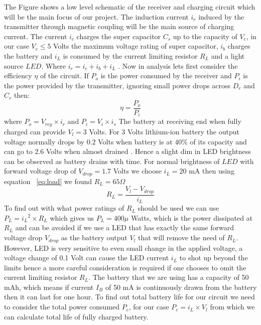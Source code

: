 
The Figure %
shows a low level schematic of the receiver and charging circuit which will be the main focus of our project. The induction current $i_r$ induced by the transmitter through magnetic coupling will be the main source of charging current. The current $i_c$ charges the super capacitor $C_s$ up to the capacity of $V_c$, in our case $V_c \leq 5$ Volts the maximum voltage rating of super capacitor, $i_b$ charges the battery and $i_L$ is consumed by the current limiting resistor $R_L$  and a light source $LED$. Where $i_r = i_c + i_b +i_L$ . Now in analysis lets first consider the efficiency ${\eta}$ of the circuit.
If $P_{o}$ is the power consumed by the receiver and $P_{i}$ is the power provided by the transmitter, ignoring small power drops across $D_r$ and $C_r$  then:
\begin{equation}\label{eq:effb}
 {\eta} = \frac{P_o}{P_i}
\end{equation}
where $P_o = V_{reg} \times i_r $ and $P_i = V_i \times i_s $
The battery at receiving end when fully charged can provide $V_l = 3 $ Volts.
For 3 Volts lithium-ion battery the output voltage normally drops by $0.2 $ Volts when battery is at $40 \%$ of its capacity and can go to $2.6 $ Volts when almost drained \cite{IAmp}. Hence a slight dim in LED brightness can be observed as battery drains with time.
For normal brightness of $LED$ with forward voltage drop of $V_{drop} = 1.7 $ Volts we choose $i_L = 20 $ mA then using equation ~\ref{eq:load} we found $R_L = 65 \Omega $
\begin{equation}\label{eq:load}
 R_L = \frac{V_l - V_{drop}}{i_L}
\end{equation}
To find out with what power ratings of $R_L$ should be used we can use $P_L = {i_L}^2 \times R_L $ which gives us $P_L = 400 \mu$ Watts, which is the power dissipated at $R_L$ and can be avoided if we use a LED that has exactly the same forward voltage drop $V_{drop}$ as the battery output $V_l$ that will remove the need of $R_L$. However, LED is very sensitive to even small change in the applied voltage, a voltage change of 0.1 Volt can cause the LED current $i_L$ to shot up beyond the limits hence a more careful consideration is required if one chooses to omit the current limiting resistor $R_L$.
The battery that we are using has a capacity of 50 mAh, which means if current $I_B$ of 50 mA  is continuously drawn from the battery then it can last for one hour. To find out total battery life for our circuit we need to consider the total power consumed $P_c$, for our case $P_c = i_L \times V_l $ from which we can calculate total life of fully charged battery.

